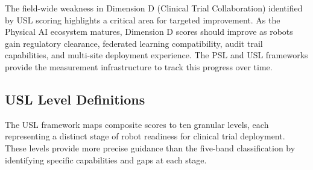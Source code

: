 The field-wide weakness in Dimension D (Clinical Trial Collaboration) identified
by USL scoring highlights a critical area for targeted improvement. As the
Physical AI ecosystem matures, Dimension D scores should improve as robots gain
regulatory clearance, federated learning compatibility, audit trail
capabilities, and multi-site deployment experience. The PSL and USL frameworks
provide the measurement infrastructure to track this progress over time.

\subsection{USL Level Definitions}
\label{subsec:usl-levels}

The USL framework maps composite scores to ten granular levels, each
representing a distinct stage of robot readiness for clinical trial deployment.
These levels provide more precise guidance than the five-band classification by
identifying specific capabilities and gaps at each stage.

